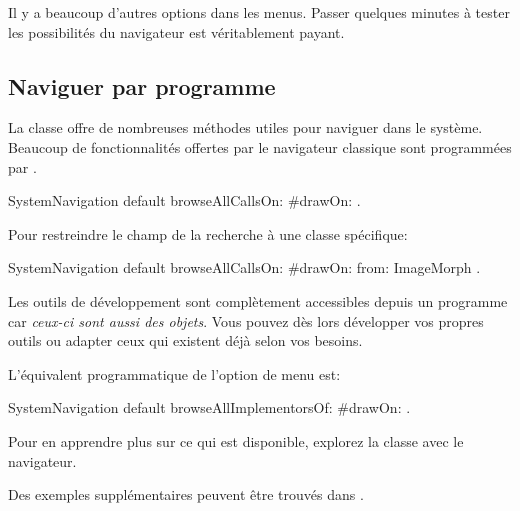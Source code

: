 \documentclass[a4paper,10pt,twoside]{book}
\begin{document}

Il y a beaucoup d'autres options dans les menus.  Passer quelques
minutes à tester les possibilités du navigateur est véritablement payant.  


\subsection{Naviguer par programme} %

La classe  offre de nombreuses méthodes utiles
pour naviguer dans le système.
Beaucoup de fonctionnalités offertes par le navigateur classique
sont programmées par
.


\begin{code}{}
SystemNavigation default browseAllCallsOn: #drawOn: .
\end{code}
Pour restreindre le champ de la recherche à une classe spécifique:
\begin{code}{}
SystemNavigation default browseAllCallsOn: #drawOn: from: ImageMorph .
\end{code}
Les outils de développement sont complètement accessibles depuis un
programme car \emph{ceux-ci sont aussi des objets}. Vous pouvez dès lors
développer vos propres outils ou adapter ceux qui existent déjà
selon vos besoins.

L'équivalent programmatique de l'option de menu
 est: %
\begin{code}{}
SystemNavigation default browseAllImplementorsOf: #drawOn: .
\end{code}

Pour en apprendre plus sur ce qui est disponible, explorez la classe
 avec le navigateur.

Des exemples supplémentaires peuvent être trouvés dans
 .

\end{document}
